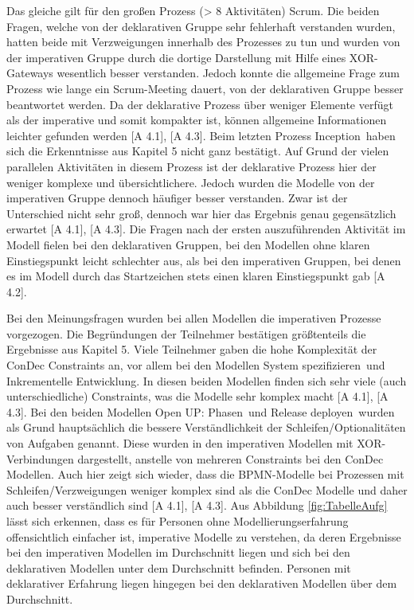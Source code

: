 Das gleiche gilt für den großen Prozess (> 8 Aktivitäten) \grqq Scrum\grqq. Die beiden Fragen, welche von der deklarativen Gruppe sehr fehlerhaft verstanden wurden, hatten beide mit Verzweigungen innerhalb des Prozesses zu tun und wurden von der imperativen Gruppe durch die dortige Darstellung mit Hilfe eines XOR-Gateways wesentlich besser verstanden. Jedoch konnte die allgemeine Frage zum Prozess wie lange ein Scrum-Meeting dauert, von der deklarativen Gruppe besser beantwortet werden. Da der deklarative Prozess über weniger Elemente verfügt als der imperative und somit kompakter ist, können allgemeine Informationen leichter gefunden werden [A 4.1], [A 4.3]. \newline
Beim letzten Prozess \grqq Inception\grqq \ haben sich die Erkenntnisse aus Kapitel 5 nicht ganz bestätigt. Auf Grund der vielen parallelen Aktivitäten in diesem Prozess ist der deklarative Prozess hier der weniger komplexe und übersichtlichere. Jedoch wurden die Modelle von der imperativen Gruppe dennoch häufiger besser verstanden. Zwar ist der Unterschied nicht sehr groß, dennoch war hier das Ergebnis genau gegensätzlich erwartet [A 4.1], [A 4.3].\newline
Die Fragen nach der ersten auszuführenden Aktivität im Modell fielen bei den deklarativen Gruppen, bei den Modellen ohne klaren Einstiegspunkt leicht schlechter aus, als bei den imperativen Gruppen, bei denen es im Modell durch das Startzeichen stets einen klaren Einstiegspunkt gab [A 4.2]. \newline

Bei den Meinungsfragen wurden bei allen Modellen die imperativen Prozesse vorgezogen. Die Begründungen der Teilnehmer bestätigen größtenteils die Ergebnisse aus Kapitel 5. Viele Teilnehmer gaben die hohe Komplexität der ConDec Constraints an, vor allem bei den Modellen \grqq System spezifizieren\grqq \ und \grqq Inkrementelle Entwicklung\grqq. In diesen beiden Modellen finden sich sehr viele (auch unterschiedliche) Constraints, was die Modelle sehr komplex macht [A 4.1], [A 4.3].\newline
Bei den beiden Modellen \grqq Open UP: Phasen\grqq \ und \grqq Release deployen\grqq \ wurden als Grund hauptsächlich die bessere Verständlichkeit der Schleifen/Optionalitäten von Aufgaben genannt. Diese wurden in den imperativen Modellen mit XOR-Verbindungen dargestellt, anstelle von mehreren Constraints bei den ConDec Modellen. Auch hier zeigt sich wieder, dass die BPMN-Modelle bei Prozessen mit Schleifen/Verzweigungen weniger komplex sind als die ConDec Modelle und daher auch besser verständlich sind [A 4.1], [A 4.3].\newline
Aus Abbildung \ref{fig:TabelleAufg} lässt sich erkennen, dass es für Personen ohne Modellierungserfahrung offensichtlich einfacher ist, imperative Modelle zu verstehen, da deren Ergebnisse bei den imperativen Modellen im Durchschnitt liegen und sich bei den deklarativen Modellen unter dem Durchschnitt befinden. Personen mit deklarativer Erfahrung liegen hingegen bei den deklarativen Modellen über dem Durchschnitt.\newline



